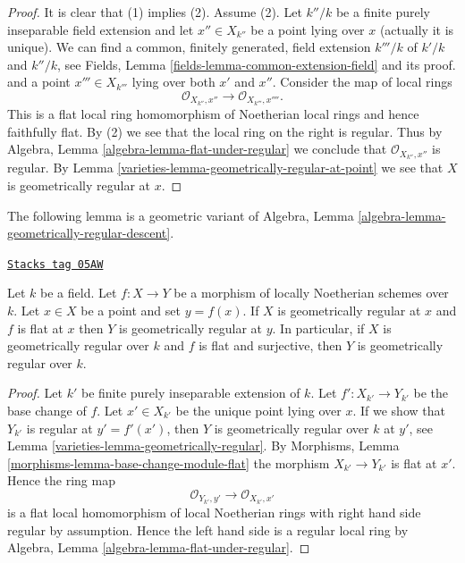 \begin{proof}

It is clear that (1) implies (2). Assume (2).
Let $k''/k$ be a finite purely inseparable field extension
and let $x'' \in X_{k''}$ be a point lying over $x$ (actually it is
unique). We can find a common, finitely generated, field extension
$k'''/k$ of $k'/k$ and $k''/k$, see
Fields, Lemma \ref{fields-lemma-common-extension-field} and its proof.
and a point $x''' \in X_{k'''}$ lying over both $x'$ and $x''$.
Consider the map of local rings
$$
\mathcal{O}_{X_{k''}, x''} \longrightarrow \mathcal{O}_{X_{k'''}, x''''}.
$$
This is a flat local ring homomorphism of Noetherian local rings
and hence faithfully flat.
By (2) we see that the local ring on the right is regular.
Thus by Algebra, Lemma \ref{algebra-lemma-flat-under-regular}
we conclude that $\mathcal{O}_{X_{k''}, x''}$ is regular.
By Lemma \ref{varieties-lemma-geometrically-regular-at-point} we see that $X$
is geometrically regular at $x$.
\end{proof}

The following lemma is a geometric variant of
Algebra, Lemma \ref{algebra-lemma-geometrically-regular-descent}.

\begin{lemma}
\label{varieties-lemma-flat-under-geometrically-regular}
\href{https://stacks.math.columbia.edu/tag/05AW}{\texttt{Stacks tag 05AW}}

Let $k$ be a field.
Let $f : X \to Y$ be a morphism of locally Noetherian schemes over $k$.
Let $x \in X$ be a point and set $y = f(x)$.
If $X$ is geometrically regular at $x$ and
$f$ is flat at $x$ then $Y$ is geometrically regular at $y$.
In particular, if $X$ is geometrically regular over $k$ and
$f$ is flat and surjective, then $Y$ is geometrically regular over $k$.
\end{lemma}

\begin{proof}

Let $k'$ be finite purely inseparable extension of $k$.
Let $f' : X_{k'} \to Y_{k'}$ be the base change of $f$.
Let $x' \in X_{k'}$ be the unique point lying over $x$.
If we show that $Y_{k'}$ is regular at $y' = f'(x')$, then
$Y$ is geometrically regular over $k$ at $y'$, see
Lemma \ref{varieties-lemma-geometrically-regular}.
By
Morphisms, Lemma \ref{morphisms-lemma-base-change-module-flat}
the morphism $X_{k'} \to Y_{k'}$ is flat at $x'$.
Hence the ring map
$$
\mathcal{O}_{Y_{k'}, y'}
\longrightarrow
\mathcal{O}_{X_{k'}, x'}
$$
is a flat local homomorphism of local Noetherian rings with
right hand side regular by assumption. Hence the left hand side
is a regular local ring by
Algebra, Lemma \ref{algebra-lemma-flat-under-regular}.
\end{proof}

